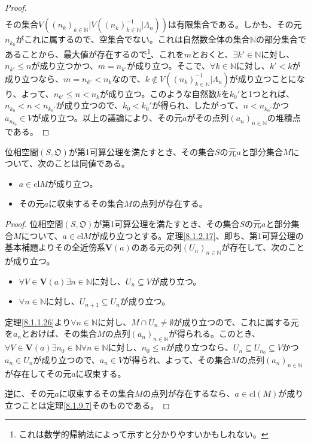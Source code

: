 \documentclass[dvipdfmx]{jsarticle}
\begin{document}
\begin{proof}
\begin{align*}
\end{align*}
その集合$V\left( \left( n_{k} \right)_{k \in \mathbb{N}}|V\left( \left( n_{k} \right)_{k \in \mathbb{N}}^{- 1}|\varLambda_{n} \right) \right)$は有限集合である。しかも、その元$n_{k_{0}}$がこれに属するので、空集合でない。これは自然数全体の集合$\mathbb{N}$の部分集合であることから、最大値が存在するので\footnote{これは数学的帰納法によって示すと分かりやすいかもしれない。}、これを$m$とおくと、$\exists k' \in \mathbb{N}$に対し、$n_{k'} \leq n$が成り立つかつ、$m = n_{k'}$が成り立つ。そこで、$\forall k \in \mathbb{N}$に対し、$k' < k$が成り立つなら、$m = n_{k'} < n_{k}$なので、$k \notin V\left( \left( n_{k} \right)_{k \in \mathbb{N}}^{- 1}|\varLambda_{n} \right)$が成り立つことになり、よって、$n_{k'} \leq n < n_{k}$が成り立つ。このような自然数$k$を$k_{0}'$と1つとれば、$n_{k_{0}} < n < n_{k_{0}'}$が成り立つので、$k_{0} < k_{0}'$が得られ、したがって、$n < n_{k_{0}'}$かつ$a_{n_{k_{0}}} \in V$が成り立つ。以上の議論により、その元$a$がその点列$\left( a_{n} \right)_{n \in \mathbb{N}}$の堆積点である。
\end{proof}
\begin{thm}\label{8.1.10.2}
位相空間$\left( S,\mathfrak{O} \right)$が第1可算公理を満たすとき、その集合$S$の元$a$と部分集合$M$について、次のことは同値である。
\begin{itemize}
\item
  $a \in {\mathrm{cl}}M$が成り立つ。
\item
  その元$a$に収束するその集合$M$の点列が存在する。
\end{itemize}
\end{thm}
\begin{proof}
位相空間$\left( S,\mathfrak{O} \right)$が第1可算公理を満たすとき、その集合$S$の元$a$と部分集合$M$について、$a \in {\mathrm{cl}}M$が成り立つとする。定理\ref{8.1.2.17}、即ち、第1可算公理の基本補題よりその全近傍系$\mathbf{V}(a)$のある元の列$\left( U_{n} \right)_{n \in \mathbb{N}}$が存在して、次のことが成り立つ。
\begin{itemize}
\item
  $\forall V \in \mathbf{V}(a)\exists n \in \mathbb{N}$に対し、$U_{n} \subseteq V$が成り立つ。
\item
  $\forall n \in \mathbb{N}$に対し、$U_{n + 1} \subseteq U_{n}$が成り立つ。
\end{itemize}
定理\ref{8.1.1.26}より$\forall n \in \mathbb{N}$に対し、$M \cap U_{n} \neq \emptyset$が成り立つので、これに属する元を$a_{n}$とおけば、その集合$M$の点列$\left( a_{n} \right)_{n \in \mathbb{N}}$が得られる。このとき、$\forall V \in \mathbf{V}(a)\exists n_{0} \in \mathbb{N}\forall n \in \mathbb{N}$に対し、$n_{0} \leq n$が成り立つなら、$U_{n} \subseteq U_{n_{0}} \subseteq V$かつ$a_{n} \in U_{n}$が成り立つので、$a_{n} \in V$が得られ、よって、その集合$M$の点列$\left( a_{n} \right)_{n \in \mathbb{N}}$が存在してその元$a$に収束する。\par
逆に、その元$a$に収束するその集合$M$の点列が存在するなら、$a \in {\mathrm{cl}}(M)$が成り立つことは定理\ref{8.1.9.7}そのものである。
\end{proof}
\end{document}
